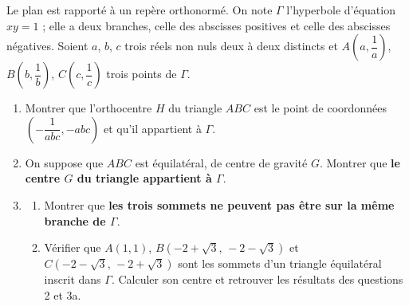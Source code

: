 
Le plan est rapporté à un repère orthonormé. On note $\Gamma$ l'hyperbole d'équation $xy=1$ ; elle a deux branches, celle des abscisses positives et celle des abscisses négatives.
Soient $a$, $b$, $c$ trois réels non nuls deux à deux distincts et $A\left(a,\dfrac1a\right)$, $B\left(b,\dfrac1b\right)$, $C\left(c,\dfrac1c\right)$ trois points de $\Gamma$.

\begin{enumerate}
  \item Montrer que l'orthocentre $H$ du triangle $ABC$ est le point de coordonnées $\left(-\dfrac1{abc},-abc\right)$ et qu'il appartient à $\Gamma$.
  \item On suppose que $ABC$ est équilatéral, de centre de gravité $G$. Montrer que \textbf{le centre $G$ du triangle appartient à $\Gamma$}.
  \item
  \begin{enumerate}
    \item Montrer que \textbf{les trois sommets ne peuvent pas être sur la même branche de $\Gamma$}.
    \item Vérifier que $A(1,1)$, $B(-2+\sqrt3,\,-2-\sqrt3)$ et $C(-2-\sqrt3,\,-2+\sqrt3)$ sont les sommets d'un triangle équilatéral inscrit dans $\Gamma$. Calculer son centre et retrouver les résultats des questions 2 et 3a.
  \end{enumerate}
\end{enumerate}

